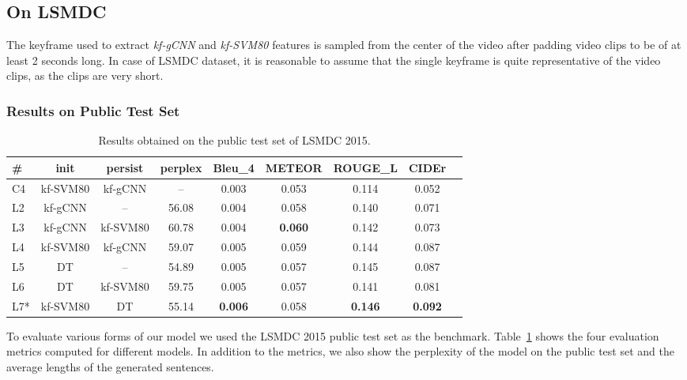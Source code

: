 \subsection{On LSMDC}
The keyframe used to extract \emph{kf-gCNN} and \emph{kf-SVM80} features is
sampled from the center of the video after padding video clips to be of at least
2 seconds long.
In case of LSMDC dataset, it is reasonable to assume that the single keyframe is
quite representative of the video clips, as the clips are very short.

\subsubsection{Results on Public Test Set}
\begin{table}[t]
  \newcommand{\modpar}[4]{%
    \multirow{2}{*}{\emph{#1}} & \multirow{2}{*}{#2} & \multirow{2}{*}{#3}
    & \multirow{2}{*}{#4}}
  \newcommand{\bs}{\bf \small}
  \centering
  \begin{adjustbox}{center}
    \begin{tabular}{|l|c|c|c|c|c|c|c|c|}
        \hline\hline
        \bs \#   &\bs init &\bs persist &\bs perplex&\bs Bleu\_4&\bs METEOR &\bs ROUGE\_L &\bs CIDEr  \\\hline\hline
        C4   & kf-SVM80 & kf-gCNN  &  --   & 0.003   &   0.053 &   0.114&   0.052 \\\hline
        L2   & kf-gCNN  & --    & 56.08 & 0.004   &   0.058 &   0.140&   0.071 \\
        L3   & kf-gCNN  & kf-SVM80 & 60.78 & 0.004   &\bf0.060 &   0.142&   0.073 \\
        L4   & kf-SVM80 & kf-gCNN  & 59.07 & 0.005   &   0.059 &   0.144&   0.087 \\\hline
        L5   & DT    & --    & 54.89 & 0.005   &   0.057 &   0.145&   0.087 \\
        L6   & DT    & kf-SVM80 & 59.75 & 0.005   &   0.057 &   0.141&   0.081 \\
        L7*  & kf-SVM80 & DT    & 55.14 &\bf0.006 &   0.058 &\bf0.146&\bf0.092 \\\hline
    \end{tabular}
  \end{adjustbox}
    \caption{Results obtained on the public test set of LSMDC 2015.}
    \label{tab:resLsmdcVal}
\end{table}

To evaluate various forms of our model we used the LSMDC 2015 public test
set as the benchmark. 
Table~\ref{tab:resLsmdcVal} shows the four evaluation metrics computed for different
models.
In addition to the metrics, we also show the perplexity of the model on the
public test set and the average lengths of the generated sentences.

